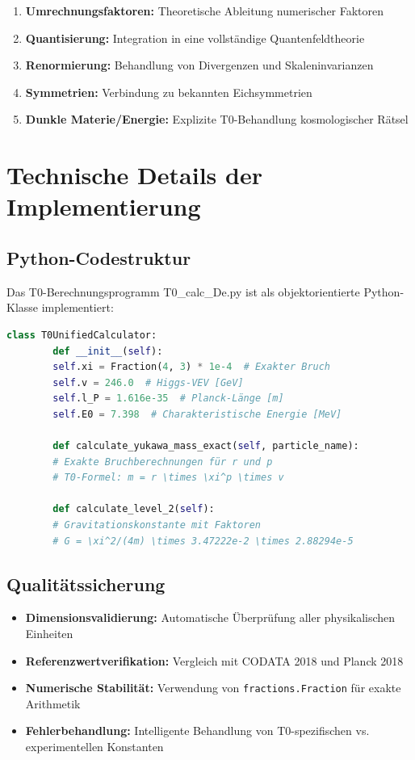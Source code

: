 	\begin{enumerate}
		\item \textbf{Umrechnungsfaktoren:} Theoretische Ableitung numerischer Faktoren
		\item \textbf{Quantisierung:} Integration in eine vollständige Quantenfeldtheorie
		\item \textbf{Renormierung:} Behandlung von Divergenzen und Skaleninvarianzen
		\item \textbf{Symmetrien:} Verbindung zu bekannten Eichsymmetrien
		\item \textbf{Dunkle Materie/Energie:} Explizite T0-Behandlung kosmologischer Rätsel
	\end{enumerate}
	
	\section{Technische Details der Implementierung}
	
	\subsection{Python-Codestruktur}
	
	Das T0-Berechnungsprogramm T0\_calc\_De.py ist als objektorientierte Python-Klasse implementiert:
	
	\begin{lstlisting}[language=Python, basicstyle=\small\ttfamily]
		class T0UnifiedCalculator:
		def __init__(self):
		self.xi = Fraction(4, 3) * 1e-4  # Exakter Bruch
		self.v = 246.0  # Higgs-VEV [GeV]
		self.l_P = 1.616e-35  # Planck-Länge [m]
		self.E0 = 7.398  # Charakteristische Energie [MeV]
		
		def calculate_yukawa_mass_exact(self, particle_name):
		# Exakte Bruchberechnungen für r und p
		# T0-Formel: m = r \times \xi^p \times v
		
		def calculate_level_2(self):
		# Gravitationskonstante mit Faktoren
		# G = \xi^2/(4m) \times 3.47222e-2 \times 2.88294e-5
	\end{lstlisting}
	
	\subsection{Qualitätssicherung}
	
	\begin{itemize}
		\item \textbf{Dimensionsvalidierung:} Automatische Überprüfung aller physikalischen Einheiten
		\item \textbf{Referenzwertverifikation:} Vergleich mit CODATA 2018 und Planck 2018
		\item \textbf{Numerische Stabilität:} Verwendung von \texttt{fractions.Fraction} für exakte Arithmetik
		\item \textbf{Fehlerbehandlung:} Intelligente Behandlung von T0-spezifischen vs. experimentellen Konstanten
	\end{itemize}
	
